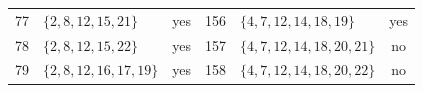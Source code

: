 \documentclass[aps,pra,reprint,superscriptaddress,longbibliography,nofootinbib,floatfix,10pt]{revtex4-2}
\theoremstyle{definition}
\begin{document}
\begin{longtable}{rlc@{\qquad}rlc}
77 & $\{2,\allowbreak 8,\allowbreak 12,\allowbreak 15,\allowbreak 21\}$ & yes & 156 & $\{4,\allowbreak 7,\allowbreak 12,\allowbreak 14,\allowbreak 18,\allowbreak 19\}$ & yes\\
78 & $\{2,\allowbreak 8,\allowbreak 12,\allowbreak 15,\allowbreak 22\}$ & yes & 157 & $\{4,\allowbreak 7,\allowbreak 12,\allowbreak 14,\allowbreak 18,\allowbreak 20,\allowbreak 21\}$ & no\\
79 & $\{2,\allowbreak 8,\allowbreak 12,\allowbreak 16,\allowbreak 17,\allowbreak 19\}$ & yes & 158 & $\{4,\allowbreak 7,\allowbreak 12,\allowbreak 14,\allowbreak 18,\allowbreak 20,\allowbreak 22\}$ & no\\
\end{longtable}\endgroup

\end{document}

